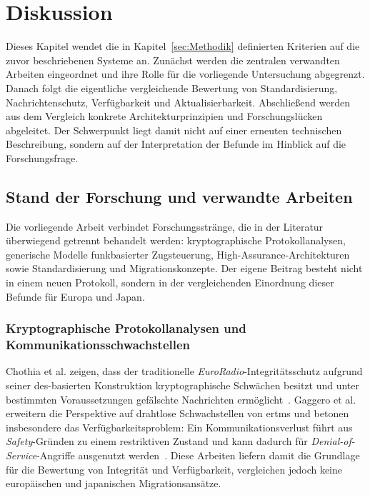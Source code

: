 \documentclass[runningheads]{res/llncs}
\begin{document}
\section{Diskussion}
\label{sec:Diskussion}

Dieses Kapitel wendet die in Kapitel~\ref{sec:Methodik} definierten Kriterien auf die zuvor beschriebenen Systeme an. Zunächst werden die zentralen verwandten Arbeiten eingeordnet und ihre Rolle für die vorliegende Untersuchung abgegrenzt. Danach folgt die eigentliche vergleichende Bewertung von Standardisierung, Nachrichtenschutz, Verfügbarkeit und Aktualisierbarkeit. Abschließend werden aus dem Vergleich konkrete Architekturprinzipien und Forschungslücken abgeleitet. Der Schwerpunkt liegt damit nicht auf einer erneuten technischen Beschreibung, sondern auf der Interpretation der Befunde im Hinblick auf die Forschungsfrage.

\subsection{Stand der Forschung und verwandte Arbeiten}
\label{sec:Stand_der_Forschung_und_verwandte_Arbeiten}
Die vorliegende Arbeit verbindet Forschungsstränge, die in der Literatur überwiegend getrennt behandelt werden: kryptographische Protokollanalysen, generische Modelle funkbasierter Zugsteuerung, High-Assurance-Architekturen sowie Standardisierung und Migrationskonzepte. Der eigene Beitrag besteht nicht in einem neuen Protokoll, sondern in der vergleichenden Einordnung dieser Befunde für Europa und Japan.

\subsubsection{Kryptographische Protokollanalysen und Kommunikationsschwachstellen}
Chothia et al. zeigen, dass der traditionelle \textit{EuroRadio}-Integritätsschutz aufgrund seiner \gls{des}-basierten Konstruktion kryptographische Schwächen besitzt und unter bestimmten Voraussetzungen gefälschte Nachrichten ermöglicht~\parencite[S. 743--756]{chothiaAttack2017}. Gaggero et al. erweitern die Perspektive auf drahtlose Schwachstellen von \gls{ertms} und betonen insbesondere das Verfügbarkeitsproblem: Ein Kommunikationsverlust führt aus \textit{Safety}-Gründen zu einem restriktiven Zustand und kann dadurch für \textit{Denial-of-Service}-Angriffe ausgenutzt werden~\parencite[S. 52--61]{gaggeroSurvey2024}. Diese Arbeiten liefern damit die Grundlage für die Bewertung von Integrität und Verfügbarkeit, vergleichen jedoch keine europäischen und japanischen Migrationsansätze.
\end{document}
